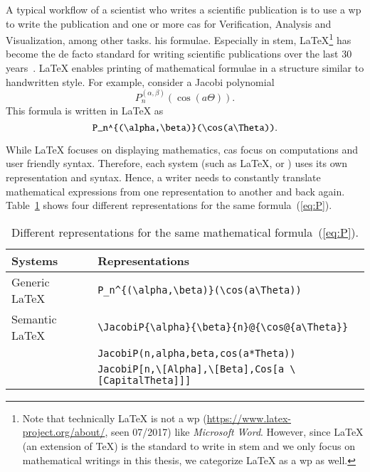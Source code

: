 A typical workflow of a scientist who writes a scientific publication is to use a \gls{wp} to write the publication and one or more \gls{cas} for Verification, Analysis and Visualization, among other tasks. his formulae. Especially in \gls{stem}, \LaTeX\footnote{Note that technically \LaTeX{} is not a \gls{wp} (\url{https://www.latex-project.org/about/}, seen 07/2017) like \textit{Microsoft Word}. However, since \LaTeX{} (an extension of \TeX) is the standard to write in \gls{stem} and we only focus on mathematical writings in this thesis, we categorize \LaTeX{} as a \gls{wp} as well.} has become the de facto standard for writing scientific publications over the last 30 years~\cites{LATEX:Standard}[559]{DigitalTypo}{Knuth}. \LaTeX{} enables printing of mathematical formulae in a structure similar to handwritten style. For example, consider a Jacobi polynomial~\cite[(18.3), table 1]{NIST:DLMF}
\begin{equation}\label{eq:P}
P_n^{(\alpha , \beta)}(\cos(a\Theta)).
\end{equation}
This formula is written in \LaTeX{} as
\begin{equation}\label{eq:P-tex}
\verb|P_n^{(\alpha,\beta)}(\cos(a\Theta))|.
\end{equation}

While \LaTeX{} focuses on displaying mathematics, \gls{cas} focus on computations and user friendly syntax. Therefore, each system (such as \LaTeX{}, \Maple{} or \Mathematica) uses its own representation and syntax. Hence, a writer needs to constantly translate mathematical expressions from one representation to another and back again. Table~\ref{tab:JacobiP-usecase} shows four different representations for the same formula~(\ref{eq:P}).

\begin{table}[ht]
	\centering
	\begin{tabular}{ll}
		\hline
		Systems & Representations \\
		\hline
		\hline
		Generic \LaTeX\ & \verb|P_n^{(\alpha,\beta)}(\cos(a\Theta))| \\ 
		Semantic \LaTeX\ & \verb|\JacobiP{\alpha}{\beta}{n}@{\cos@{a\Theta}}| \\
		\Maple & \verb|JacobiP(n,alpha,beta,cos(a*Theta))| \\ 
		\Mathematica & \verb|JacobiP[n,\[Alpha],\[Beta],Cos[a \[CapitalTheta]]]|\\
		\hline
	\end{tabular}
	\caption{Different representations for the same mathematical formula~(\ref{eq:P}).}
	\label{tab:JacobiP-usecase}
\end{table}

